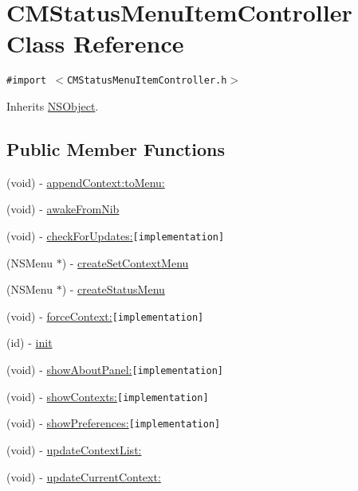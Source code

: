 \hypertarget{interface_c_m_status_menu_item_controller}{
\section{CMStatusMenuItemController Class Reference}
\label{interface_c_m_status_menu_item_controller}
}
{\tt \#import $<$CMStatusMenuItemController.h$>$}

Inherits \hyperlink{class_n_s_object}{NSObject}.

\subsection*{Public Member Functions}
\begin{CompactItemize}
\item 
(void) - \hyperlink{interface_c_m_status_menu_item_controller_0168c3814ce904a91051a2cf1119bb0b}{appendContext:toMenu:}
\item 
(void) - \hyperlink{interface_c_m_status_menu_item_controller_29d817892c511160f9bf827e70032a22}{awakeFromNib}
\item 
(void) - \hyperlink{interface_c_m_status_menu_item_controller_b0dee8ca25e6b8b64bb13ff501c869d4}{checkForUpdates:}{\tt  \mbox{[}implementation\mbox{]}}
\item 
(NSMenu $\ast$) - \hyperlink{interface_c_m_status_menu_item_controller_5bcc2dbf48b9d5a3af4f8193488d5f43}{createSetContextMenu}
\item 
(NSMenu $\ast$) - \hyperlink{interface_c_m_status_menu_item_controller_2f82c06d70babe8be094170f7819911c}{createStatusMenu}
\item 
(void) - \hyperlink{interface_c_m_status_menu_item_controller_47b8a5c1ec9a9626b2866572e6da8518}{forceContext:}{\tt  \mbox{[}implementation\mbox{]}}
\item 
(id) - \hyperlink{interface_c_m_status_menu_item_controller_ff3f38eb08f3760a4efa6dc9ea7c08a4}{init}
\item 
(void) - \hyperlink{interface_c_m_status_menu_item_controller_5adaccb51edcf55ea0c123ea3ccea3fd}{showAboutPanel:}{\tt  \mbox{[}implementation\mbox{]}}
\item 
(void) - \hyperlink{interface_c_m_status_menu_item_controller_68f7c2c7b01ebf45e0d01c72e0438147}{showContexts:}{\tt  \mbox{[}implementation\mbox{]}}
\item 
(void) - \hyperlink{interface_c_m_status_menu_item_controller_329307ae728069e7cfc670ca37896cac}{showPreferences:}{\tt  \mbox{[}implementation\mbox{]}}
\item 
(void) - \hyperlink{interface_c_m_status_menu_item_controller_2bfbf7ad1b53be39e06d227f5abdb8f8}{updateContextList:}
\item 
(void) - \hyperlink{interface_c_m_status_menu_item_controller_6f883df1dbf903772d2ea66d4c025c2f}{updateCurrentContext:}
\end{CompactItemize}
